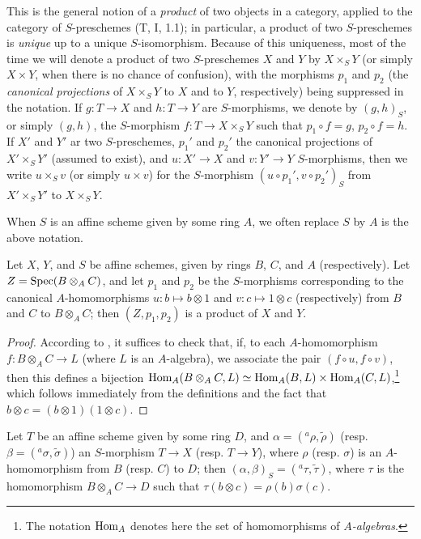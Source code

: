 This is the general notion of a \emph{product} of two objects in a category, applied
to the category of $S$-preschemes (T, I, 1.1); in particular, a product of two $S$-preschemes
is \emph{unique} up to a unique $S$-isomorphism. Because of this uniqueness, most of the time
we will denote a product of two $S$-preschemes $X$ and $Y$ by $X\times_S Y$ (or
simply $X\times Y$, when there is no chance of confusion), with the morphisms $p_1$ and $p_2$
(the \emph{canonical projections} of $X\times_S Y$ to $X$ and to $Y$, respectively) being suppressed
in the notation. If $g:T\to X$ and $h:T\to Y$ are $S$-morphisms, we denote by $(g,h)_S$, or
simply $(g,h)$, the $S$-morphism $f:T\to X\times_S Y$ such that $p_1\circ f=g$,
$p_2\circ f=h$. If $X'$ and $Y'$ ar two $S$-preschemes, $p_1'$ and $p_2'$ the canonical
projections of $X'\times_S Y'$ (assumed to exist), and $u:X'\to X$ and $v:Y'\to Y$ $S$-morphisms, then we write $u\times_S v$ (or simply $u\times v$) for the $S$-morphism
$(u\circ p_1',v\circ p_2')_S$ from $X'\times_S Y'$ to $X\times_S Y$.

When $S$ is an affine scheme given by some ring $A$, we often replace $S$
by $A$ is the above notation.

\begin{proposition}[3.2.2]
\label{I.3.2.2}
Let $X$, $Y$, and $S$ be affine schemes, given by rings $B$, $C$, and $A$ (respectively). Let
$Z=\operatorname{Spec}(B\otimes_A C)$, and let $p_1$ and $p_2$ be the $S$-morphisms corresponding  to
the canonical $A$-homomorphisms $u:b\mapsto b\otimes 1$ and $v:c\mapsto 1\otimes c$ (respectively) from $B$
and $C$ to $B\otimes_A C$; then $(Z,p_1,p_2)$ is a product of $X$ and $Y$.
\end{proposition}

\begin{proof}
According to , it suffices to check that, if, to each $A$-homomorphism
$f:B\otimes_A C\to L$ (where $L$ is an $A$-algebra), we associate the pair
$(f\circ u,f\circ v)$, then this defines a bijection
$\operatorname{Hom}_A(B\otimes_A C,L)\simeq\operatorname{Hom}_A(B,L)\times\operatorname{Hom}_A(C,L)$,\footnote{The notation $\operatorname{Hom}_A$
denotes here the set of homomorphisms of \emph{$A$-algebras}.} which follows immediately
from the definitions and the fact that $b\otimes c=(b\otimes 1)(1\otimes c)$.
\end{proof}

\begin{corollary}[3.2.3]
\label{I.3.2.3}
Let $T$ be an affine scheme given by some ring $D$, and $\alpha=({}^a\rho,\widetilde{\rho})$
(resp. $\beta=({}^a\sigma,\widetilde{\sigma})$) an $S$-morphism $T\to X$ (resp. $T\to Y$),
where $\rho$ (resp. $\sigma$) is an $A$-homomorphism from $B$ (resp. $C$) to $D$; then
$(\alpha,\beta)_S=({}^a\tau,\widetilde{\tau})$, where $\tau$ is the homomorphism
$B\otimes_A C\to D$ such that $\tau(b\otimes c)=\rho(b)\sigma(c)$.
\end{corollary}

